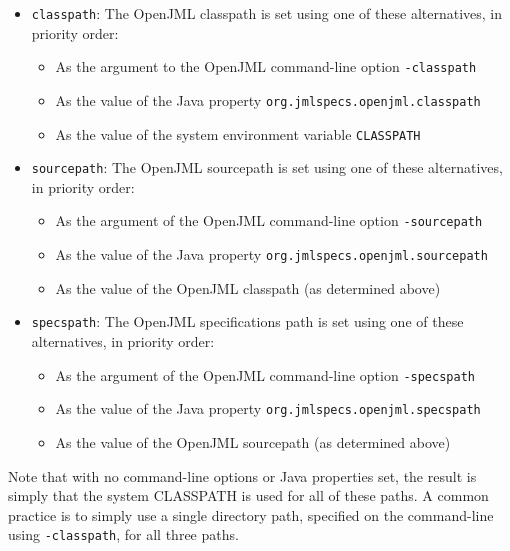 \begin{itemize}[noitemsep,nolistsep]
\item \texttt{classpath}: The OpenJML classpath is set using one of these alternatives, in priority order:
\begin{itemize}[noitemsep,nolistsep]
\item As the argument to the OpenJML command-line option \texttt{-classpath}
\item As the value of the Java property \texttt{org.jmlspecs.openjml.classpath}
\item As the value of the system environment variable \texttt{CLASSPATH}
\end{itemize}
\item \texttt{sourcepath}: The OpenJML sourcepath is set using one of these alternatives, in priority order:
\begin{itemize}[noitemsep,nolistsep]
\item As the argument of the OpenJML command-line option \texttt{-sourcepath}
\item As the value of the Java property \texttt{org.jmlspecs.openjml.sourcepath}
\item As the value of the OpenJML classpath (as determined above)
\end{itemize}
\item \texttt{specspath}: The OpenJML specifications path is set using one of these alternatives, in priority order:
\begin{itemize}[noitemsep,nolistsep]
\item As the argument of the OpenJML command-line option \texttt{-specspath}
\item As the value of the Java property \texttt{org.jmlspecs.openjml.specspath}
\item As the value of the OpenJML sourcepath (as determined above)
\end{itemize}
\end{itemize}

Note that with no command-line options or Java properties set, the result is simply that the system CLASSPATH is used for all of these paths. A common practice is to simply use a single directory path, specified on the command-line using \texttt{-classpath}, for all three paths.

